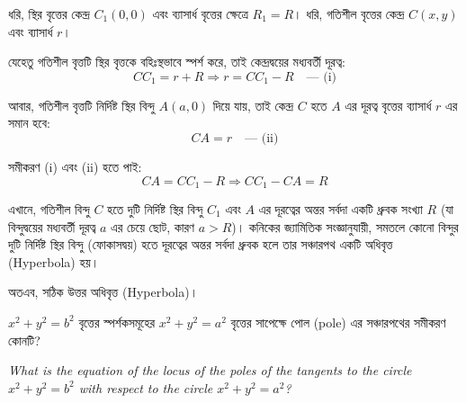 \documentclass[12pt, a4paper]{article}
\begin{document}
\begin{tcolorbox}[solutionbox={সমাধান (Solution)}]
    \noindent
    ধরি, স্থির বৃত্তের কেন্দ্র $C_1(0, 0)$ এবং ব্যাসার্ধ বৃত্তের ক্ষেত্রে $R_1 = R$। ধরি, গতিশীল বৃত্তের কেন্দ্র $C(x, y)$ এবং ব্যাসার্ধ $r$।
    
    \vspace{0.5em}
    যেহেতু গতিশীল বৃত্তটি স্থির বৃত্তকে বহিঃস্থভাবে স্পর্শ করে, তাই কেন্দ্রদ্বয়ের মধ্যবর্তী দূরত্ব:
    \[ CC_1 = r + R \Rightarrow r = CC_1 - R \quad \text{--- (i)} \]
    
    \vspace{0.5em}
    আবার, গতিশীল বৃত্তটি নির্দিষ্ট স্থির বিন্দু $A(a, 0)$ দিয়ে যায়, তাই কেন্দ্র $C$ হতে $A$ এর দূরত্ব বৃত্তের ব্যাসার্ধ $r$ এর সমান হবে:
    \[ CA = r \quad \text{--- (ii)} \]
    
    \vspace{0.5em}
    সমীকরণ (i) এবং (ii) হতে পাই:
    \[ CA = CC_1 - R \Rightarrow CC_1 - CA = R \]
    
    \vspace{0.5em}
    এখানে, গতিশীল বিন্দু $C$ হতে দুটি নির্দিষ্ট স্থির বিন্দু $C_1$ এবং $A$ এর দূরত্বের অন্তর সর্বদা একটি ধ্রুবক সংখ্যা $R$ (যা বিন্দুদ্বয়ের মধ্যবর্তী দূরত্ব $a$ এর চেয়ে ছোট, কারণ $a > R$)। কনিকের জ্যামিতিক সংজ্ঞানুযায়ী, সমতলে কোনো বিন্দুর দুটি নির্দিষ্ট স্থির বিন্দু (ফোকাসদ্বয়) হতে দূরত্বের অন্তর সর্বদা ধ্রুবক হলে তার সঞ্চারপথ একটি অধিবৃত্ত (Hyperbola) হয়।
    
    \vspace{0.5em}
    অতএব, সঠিক উত্তর অধিবৃত্ত (Hyperbola)।
\end{tcolorbox}

\vspace{2em}

\begin{tcolorbox}[questionbox={প্রশ্ন (Question) 40}]
    \noindent
    $x^2 + y^2 = b^2$ বৃত্তের স্পর্শকসমূহের $x^2 + y^2 = a^2$ বৃত্তের সাপেক্ষে পোল (pole) এর সঞ্চারপথের সমীকরণ কোনটি?
    
    \vspace{0.8em}
    \begin{english}
    \noindent\textit{\color{darkgray}
    What is the equation of the locus of the poles of the tangents to the circle $x^2 + y^2 = b^2$ with respect to the circle $x^2 + y^2 = a^2$?
    }
    \end{english}
\end{tcolorbox}
\end{document}

